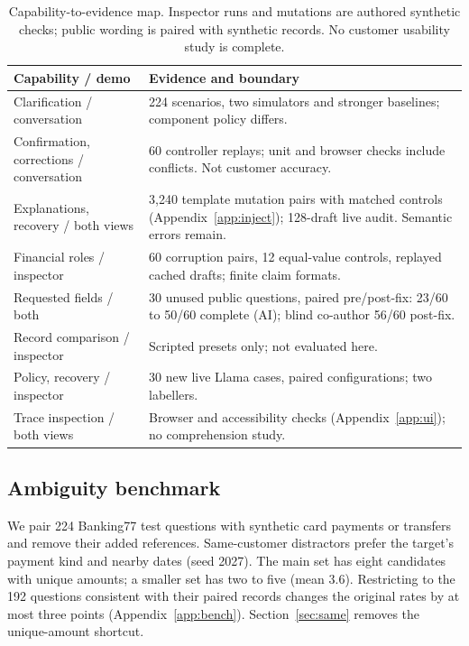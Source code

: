 \documentclass[11pt]{article}
\begin{document}
\begin{table}[t]
\centering\small
\setlength{\tabcolsep}{3pt}
\begin{tabularx}{\columnwidth}{@{}p{}X@{}}
\toprule
Capability / demo & Evidence and boundary \\
\midrule
Clarification / conversation & 224 scenarios, two simulators and stronger baselines; component policy differs. \\
Confirmation, corrections / conversation & 60 controller replays; unit and browser checks include conflicts. Not customer accuracy. \\
Explanations, recovery / both views & 3,240 template mutation pairs with matched controls (Appendix~\ref{app:inject}); 128-draft live audit. Semantic errors remain. \\
Financial roles / inspector & 60 corruption pairs, 12 equal-value controls, replayed cached drafts; finite claim formats. \\
Requested fields / both & 30 unused public questions, paired pre/post-fix: 23/60 to 50/60 complete (AI); blind co-author 56/60 post-fix. \\
Record comparison / inspector & Scripted presets only; not evaluated here. \\
Policy, recovery / inspector & 30 new live Llama cases, paired configurations; two labellers. \\
Trace inspection / both views & Browser and accessibility checks (Appendix~\ref{app:ui}); no comprehension study. \\
\bottomrule
\end{tabularx}
\caption{Capability-to-evidence map. Inspector runs and mutations are authored synthetic
checks; public wording is paired with synthetic records. No customer usability study is complete.}
\label{tab:capabilities}
\end{table}

\subsection{Ambiguity benchmark}

We pair 224 Banking77 test questions \citep{casanueva-etal-2020-efficient} with synthetic card
payments or transfers and remove their added references. Same-customer distractors prefer the
target's payment kind and nearby dates (seed 2027). The main set has eight candidates with
unique amounts; a smaller set has two to five (mean 3.6). Restricting to the 192 questions
consistent with their paired records changes the original rates by at most three points
(Appendix~\ref{app:bench}). Section~\ref{sec:same} removes the unique-amount shortcut.
\end{document}
